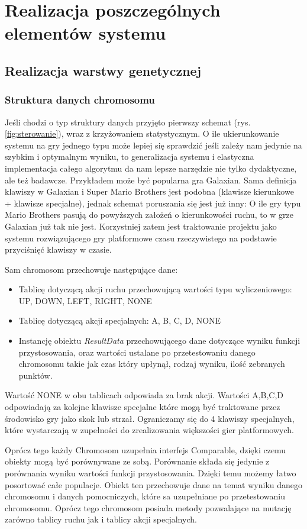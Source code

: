 \section{Realizacja poszczególnych elementów systemu}
\subsection{Realizacja warstwy genetycznej}
\subsubsection{Struktura danych chromosomu}
\begin{par}
	Jeśli chodzi o typ struktury danych przyjęto pierwszy schemat (rys.\ref{fig:sterowanie}), wraz z krzyżowaniem statystycznym. 
	O ile ukierunkowanie systemu na gry jednego typu może lepiej się sprawdzić jeśli zależy nam
	jedynie na szybkim i optymalnym wyniku, to generalizacja systemu i elastyczna implementacja całego algorytmu da nam lepsze narzędzie nie tylko dydaktyczne, ale też badawcze.
	Przykładem może być popularna gra Galaxian. Sama definicja klawiszy w Galaxian i Super Mario Brothers jest podobna (klawisze kierunkowe + klawisze specjalne),
	jednak schemat poruszania się jest już inny: O ile gry typu Mario Brothers pasują do powyższych założeń o kierunkowości ruchu, to w grze Galaxian już tak nie jest.
	Korzystniej zatem jest traktowanie projektu jako systemu rozwiązującego gry platformowe czasu rzeczywistego na podstawie przyciśnięć klawiszy w czasie.
\end{par}
\begin{par}
	
	Sam chromosom przechowuje następujące dane:

	\begin{itemize}
		\item Tablicę dotyczącą akcji ruchu przechowującą wartości typu wyliczeniowego: UP, DOWN, LEFT, RIGHT, NONE
		\item Tablicę dotyczącą akcji specjalnych: A, B, C, D, NONE
		\item Instancję obiektu \textit{ResultData} przechowującego dane dotyczące wyniku funkcji przystosowania, oraz wartości ustalane po przetestowaniu danego chromosomu takie jak czas który upłynął, rodzaj wyniku, ilość zebranych punktów.
	\end{itemize}

	Wartość NONE w obu tablicach odpowiada za brak akcji. 
	Wartości A,B,C,D odpowiadają za kolejne klawisze specjalne które mogą być traktowane przez środowisko gry jako skok lub strzał. 
	Ograniczamy się do 4 klawiszy specjalnych, które wystarczają w zupełności do zrealizowania większości gier platformowych.

	Oprócz tego każdy Chromosom uzupełnia interfejs Comparable, dzięki czemu obiekty mogą być porównywane ze sobą. Porównanie składa się jedynie z porównania wyniku wartości funkcji przystosowania. Dzięki temu możemy łatwo posortować całe populacje.
	Obiekt ten przechowuje dane na temat wyniku danego chromosomu i danych pomocniczych, które sa uzupełniane po przetestowaniu chromosomu. 
	Oprócz tego chromosom posiada metody pozwalające na mutację zarówno tablicy ruchu jak i tablicy akcji specjalnych.
\end{par}
